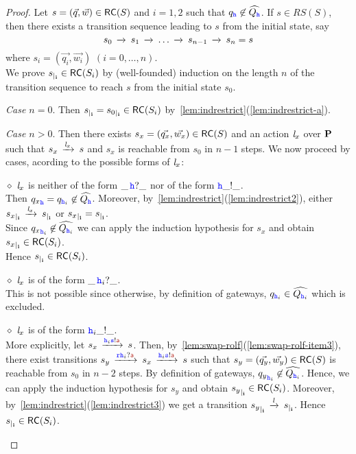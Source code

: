 \begin{proof}
Let $s = (\vec{q},\vec{w}) \in \mathsf{RC}(S)$ and $i=1,2$ such that ${q}_{{\mathtt{\color{blue}{ {h}}}}}\not\in\widehat{Q_{{\mathtt{\color{blue}{ {h}}}}}}$.
If $s \in RS(S)$, then there exists a transition sequence leading to $s$ from the initial state, say
$$s_0\,\xrightarrow{}_{{}}\,s_1\,\xrightarrow{}_{{}}\, \ldots\,\xrightarrow{}_{{}}\, s_{n-1}\,\xrightarrow{}_{{}}\,s_n=s$$
where $s_i = (\vec{q_i},\vec{w_i})$ $(i=0,\ldots,n)$.\\
We prove ${s}_{\mid_{\mathbf{i}}}\in \mathsf{RC}(S_i)$  by (well-founded) induction on the length $n$ of the transition sequence to reach $s$ from the initial state $s_0$.

{\em Case $n=0$}. Then ${s}_{\mid_{\mathbf{i}}} = {s_0}_{\mid_{\mathbf{i}}} \in \mathsf{RC}(S_i)$
by~\cref{lem:indrestrict}(\ref{lem:indrestrict-a}).


{\em Case $n>0$}.
Then there exists $s_x = (\vec{q_x},\vec{w_x}) \in \mathsf{RC}(S)$ and an action $\mathit{l}_x$ over $\mathbf{P}$
such that $s_x\,\xrightarrow{\mathit{l}_x}_{{}}\,s$ and $s_x$ is reachable from $s_0$ in $n-1$ steps.
We now proceed by cases, acording to the possible forms of $\mathit{l}_x$:

\begin{description}
%
\item
\underline{$\diamond$}
$\mathit{l}_x$ is neither of the form $\_\,{\mathtt{\color{blue}{ {h}}}}?\_$ nor of the form ${\mathtt{\color{blue}{ {h}}}}\_!\_$.\\
Then ${q_x}_{{\mathtt{\color{blue}{ {h}}}}}={q}_{{\mathtt{\color{blue}{ {h}}}}_i}\not\in\widehat{Q_{{\mathtt{\color{blue}{ {h}}}}}}$.
Moreover, by~\cref{lem:indrestrict}(\ref{lem:indrestrict2}),
either ${s_x}_{\mid_{\mathbf{i}}}\,\xrightarrow{\mathit{l}_x}_{{}}\,{s}_{\mid_{\mathbf{i}}}$ or  ${s_x}_{\mid_{\mathbf{i}}}={s}_{\mid_{\mathbf{i}}}$.\\
Since ${q_x}_{{\mathtt{\color{blue}{ {h}}}}_i}\not\in\widehat{Q_{{\mathtt{\color{blue}{ {h}}}}_i}}$ we can apply the induction hypothesis for $s_x$ and obtain ${s_x}_{\mid_{\mathbf{i}}}\in \mathsf{RC}(S_i)$.\\
Hence ${s}_{\mid_{\mathbf{i}}}\in \mathsf{RC}(S_i)$.
%
\item
\underline{$\diamond$}
$\mathit{l}_x$ is of the form $\_\,{\mathtt{\color{blue}{ {h}}}}_i?\_$.\\
This is not possible since otherwise,
by definition of gateways,
${q}_{{\mathtt{\color{blue}{ {h}}}}_i}\in\widehat{Q_{{\mathtt{\color{blue}{ {h}}}}_i}}$ which is excluded. 
%
\item
\underline{$\diamond$}
$\mathit{l}_x$ is of the form ${\mathtt{\color{blue}{ {h}}}}_i\_!\_$.\\
More explicitly, let $s_x\lts{\HH_i\tts!\msg[a]}s$.
Then, by~\cref{lem:swap-rolf}(\ref{lem:swap-rolf-item3}), there exist
transitions
$s_y \lts{\ttr\HH_i?\msg[a]}s_x\lts{\HH_i\tts!\msg[a]}s$
such that $s_y = (\vec{q_y},\vec{w_y})\in \mathsf{RC}(S)$ is reachable from $s_0$ in $n-2$ steps. By definition of gateways, ${q_y}_{{\mathtt{\color{blue}{ {h}}}}_i} \not\in\widehat{Q_{{\mathtt{\color{blue}{ {h}}}}_i}}$.
Hence, we can apply the induction hypothesis for $s_y$ and obtain ${s_y}_{\mid_{\mathbf{i}}}\in \mathsf{RC}(S_i)$.
Moreover, by~\cref{lem:indrestrict}(\ref{lem:indrestrict3}) we get a transition
${s_y}_{\mid_{\mathbf{i}}}\,\xrightarrow{\mathit{l}}_{{}}\,{s}_{\mid_{\mathbf{i}}}$. Hence ${s}_{\mid_{\mathbf{i}}}\in \mathsf{RC}(S_i)$.
\end{description}


\end{proof}
